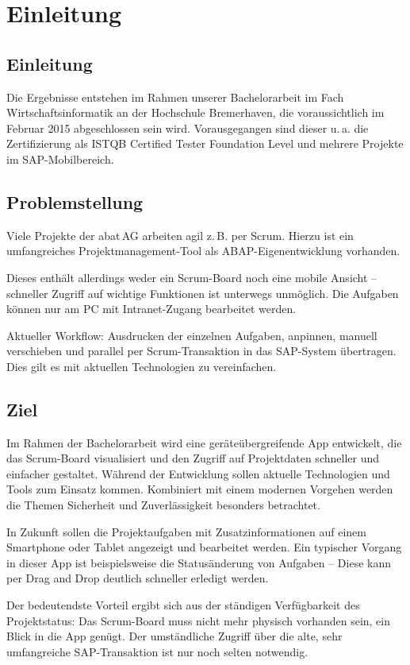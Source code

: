 \chapter{Einleitung}
\label{cha:Einleitung}

\section{Einleitung}
Die Ergebnisse entstehen im Rahmen unserer Bachelorarbeit im Fach
Wirtschaftsinformatik an der Hochschule Bremerhaven, die voraussichtlich im
Februar 2015 abgeschlossen sein wird. Vorausgegangen sind dieser u.\,a.
die Zertifizierung als ISTQB Certified Tester Foundation Level und mehrere
Projekte im SAP-Mobilbereich.

\section{Problemstellung}
Viele Projekte der abat\,AG arbeiten agil z.\,B. per Scrum.
Hierzu ist ein umfangreiches Projektmanagement-Tool als ABAP-Eigenentwicklung
vorhanden.

Dieses enthält allerdings weder ein Scrum-Board noch eine mobile Ansicht --
schneller Zugriff auf wichtige Funktionen ist unterwegs unmöglich. Die Aufgaben
können nur am PC mit Intranet-Zugang bearbeitet werden.

Aktueller Workflow: Ausdrucken der einzelnen Aufgaben, anpinnen, manuell
verschieben und parallel per Scrum-Transaktion in das SAP-System übertragen.
Dies gilt es mit aktuellen Technologien zu vereinfachen.

\section{Ziel}
Im Rahmen der Bachelorarbeit wird eine geräteübergreifende App entwickelt, die
das Scrum-Board visualisiert und den Zugriff auf Projektdaten schneller und
einfacher gestaltet.
Während der Entwicklung sollen aktuelle Technologien und Tools zum Einsatz
kommen. Kombiniert mit einem modernen Vorgehen werden die Themen Sicherheit und
Zuverlässigkeit besonders betrachtet.

In Zukunft sollen die Projektaufgaben mit Zusatzinformationen auf einem Smartphone oder
Tablet angezeigt und bearbeitet werden. Ein typischer Vorgang in dieser App ist
beispielsweise die Statusänderung von Aufgaben -- Diese kann per Drag and
Drop deutlich schneller erledigt werden.

Der bedeutendste Vorteil ergibt sich aus der ständigen Verfügbarkeit des
Projektstatus:
Das Scrum-Board muss nicht mehr physisch vorhanden sein, ein Blick in die App
genügt.
Der umständliche Zugriff über die alte, sehr umfangreiche SAP-Transaktion ist nur noch selten notwendig.

